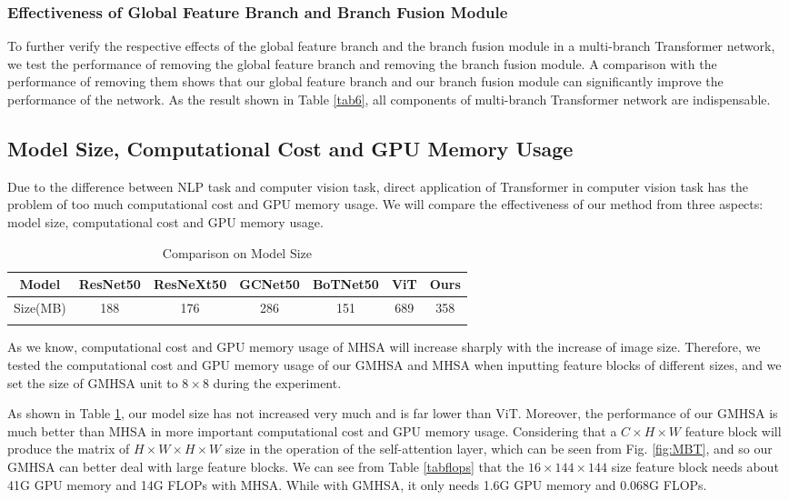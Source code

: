 \documentclass[journal]{IEEEtran}
\begin{document}
\subsubsection{Effectiveness of Global Feature Branch and Branch Fusion Module}
To further verify the respective effects of the global feature branch and the branch fusion module in a multi-branch Transformer network, we test the performance of removing the global feature branch and removing the branch fusion module. A comparison with the performance of removing them shows that our global feature branch and our branch fusion module can significantly improve the performance of the network. As the result shown in \textcolor[rgb]{0,0.541,0.855}{Table \ref{tab6}}, all components of multi-branch Transformer network are indispensable.



\subsection{Model Size, Computational Cost and GPU Memory Usage}
Due to the difference between NLP task and computer vision task, direct application of Transformer in computer vision task has the problem of too much computational cost and GPU memory usage. We will compare the effectiveness of our method from three aspects: model size, computational cost and GPU memory usage.

\begin{table}[ht]
\centering
\renewcommand\arraystretch{1.2}
\setlength{\tabcolsep}{0.6mm}
\caption{Comparison on Model Size}
\begin{tabular}{c|cccccc}
\Xhline{1pt}
Model           & ResNet50 & ResNeXt50 & GCNet50 & BoTNet50 & ViT   & Ours  \\ \hline
Size(MB) & 188    & 176     & 286   & 151    & 689 & 358 \\ \Xhline{1pt}
\end{tabular}
\label{tabpara}
\end{table}

As we know, computational cost and GPU memory usage of MHSA will increase sharply with the increase of image size. Therefore, we tested the computational cost and GPU memory usage of our GMHSA and MHSA when inputting feature blocks of different sizes, and we set the size of GMHSA unit to $8 \times 8$ during the experiment.

As shown in \textcolor[rgb]{0,0.541,0.855}{Table \ref{tabpara}}, our model size has not increased very much and is far lower than ViT. Moreover, the performance of our GMHSA is much better than MHSA in more important computational cost and GPU memory usage. Considering that a $C\times H\times W$ feature block will produce the matrix of $ H\times W \times H\times W$ size in the operation of the self-attention layer, which can be seen from \textcolor[rgb]{0,0.541,0.855}{Fig. \ref{fig:MBT}}, and so our GMHSA can better deal with large feature blocks. We can see from \textcolor[rgb]{0,0.541,0.855}{Table \ref{tabflops}} that the $16 \times 144 \times 144$ size feature block needs about 41G GPU memory and 14G FLOPs with MHSA. While with GMHSA, it only needs 1.6G GPU memory and 0.068G FLOPs.
\end{document}

